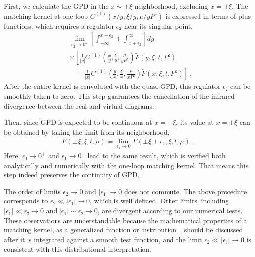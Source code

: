 \documentclass[prl,aps,twocolumn,preprintnumbers, showpacs, nofootinbib,superscriptaddress,notitlepage]{revtex4-1}
\begin{document}
First, we calculate the GPD in the $x \sim \pm \xi$ neighborhood, excluding $x = \pm \xi$. The matching kernel at one-loop $C^{(1)}\left(x/y,\xi/y,\mu/yP^z\right)$ is expressed in terms of plus functions, which requires a regulator $\epsilon_2$ near its singular point, %
\begin{align}\label{eq:plus}
&\lim_{\epsilon_2 \rightarrow 0^{+}} \left[\int_{-\infty}^{x-\epsilon_2} + \int^{\infty}_{x+\epsilon_2} \right] dy \nonumber\\
&\times\left[\frac{1}{|y|} C^{(1)}\left(\frac{x}{y},\frac{\xi}{y},\frac{\mu}{y P^z}\right) \tilde{F}(y,\xi,t,P^z) \right. \nonumber\\
&\left. \quad - \frac{1}{|x|} C^{(1)}\left(\frac{y}{x},\frac{\xi}{x},\frac{\mu}{x P^z}\right) \tilde{F}(x,\xi,t,P^z) \right]\ .
\end{align}
After the entire kernel is convoluted with the quasi-GPD, this regulator $\epsilon_2$ can be smoothly taken to zero. This step guarantees the cancellation of the infrared divergence between the real and virtual diagrams. 

Then, since GPD is expected to be continuous at $x=\pm\xi$, its value at $x=\pm\xi$ can be obtained by taking the limit from its neighborhood,
\begin{align}
F(\pm\xi,\xi,t,\mu) = \lim_{\epsilon_1 \rightarrow 0} F(\pm\xi+\epsilon_1,\xi,t,\mu) \ .
\end{align}
Here, $\epsilon_1 \rightarrow 0^{+}$ and $\epsilon_1 \rightarrow 0^{-}$ lead to the same result, which is verified both analytically and numerically with the one-loop matching kernel. That means this step indeed preserves the continuity of GPD. 

The order of limits $\epsilon_2 \rightarrow 0$ and $|\epsilon_1| \rightarrow 0$ does not commute. The above procedure corresponds to $\epsilon_2 \ll |\epsilon_1| \rightarrow 0$, which is well defined. Other limits, including $|\epsilon_1| \ll \epsilon_2 \rightarrow 0$ and $|\epsilon_1| \sim \epsilon_2 \rightarrow 0$, are divergent according to our numerical tests. These observations are understandable because the mathematical properties of a matching kernel, as a generalized function or distribution~\cite{Friedlander:1998}, should be discussed after it is integrated against a smooth test function, and the limit $\epsilon_2 \ll |\epsilon_1| \rightarrow 0$ is consistent with this distributional interpretation.
\end{document}
